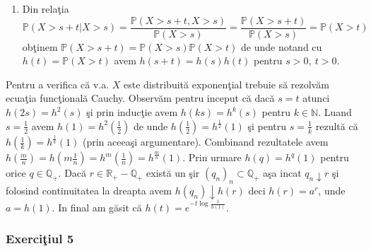 \documentclass[]{article}
\providecommand{\tightlist}{%
  \setlength{\itemsep}{0pt}\setlength{\parskip}{0pt}}
\def\RR{{\mathbb R}}
\def\QQ{{\mathbb Q}}
\def\PP{{\mathbb P}}
\def\NN{{\mathbb N}}
\begin{document}
\begin{enumerate}
\def\labelenumi{\alph{enumi})}
\setcounter{enumi}{1}
\tightlist
\item
  Din rela\c tia \[
  \PP(X>s+t|X>s)=\frac{\PP(X>s+t,X>s)}{\PP(X>s)}=\frac{\PP(X>s+t)}{\PP(X>s)}=\PP(X>t)
  \] ob\c tinem \(\PP(X>s+t)=\PP(X>s)\PP(X>t)\) de unde notand cu
  \(h(t)=\PP(X>t)\) avem \(h(s+t)=h(s)h(t)\) pentru \(s>0,\ t>0\).
\end{enumerate}

Pentru a verifica c\u a v.a. \(X\) este distribuit\u a exponen\c tial
trebuie s\u a rezolv\u am ecua\c tia func\c tional\u a Cauchy.
Observ\u am pentru inceput c\u a dac\u a \(s=t\) atunci \(h(2s)=h^2(s)\)
\c si prin induc\c tie avem \(h(ks)=h^k(s)\) pentru \(k\in\NN\). Luand
\(s=\frac{1}{2}\) avem \(h(1)=h^2(\frac{1}{2})\) de unde
\(h(\frac{1}{2})=h^{\frac{1}{2}}(1)\) \c si pentru \(s=\frac{1}{k}\)
rezult\u a c\u a \(h(\frac{1}{k})=h^{\frac{1}{k}}(1)\) (prin aceea\c si
argumentare). Combinand rezultatele avem
\(h(\frac{m}{n})=h(m\frac{1}{n})=h^m(\frac{1}{n})=h^{\frac{m}{n}}(1)\).
Prin urmare \(h(q)=h^q(1)\) pentru orice \(q\in\QQ_+\). Dac\u a
\(r\in \RR_+-\QQ_+\) exist\u a un \c sir \((q_n)_n\subset\QQ_+\) a\c sa
incat \(q_n\downarrow r\) \c si folosind continuitatea la dreapta avem
\(h(q_n)\downarrow h(r)\) deci \(h(r)=a^r\), unde \(a=h(1)\). In final
am g\u asit c\u a \(h(t)=e^{-t\log{\frac{1}{h(1)}}}\).

\subsubsection{\texorpdfstring{Exerci\c tiul
5}{Exerciiul 5}}\label{exerciiul-5}
\end{document}
